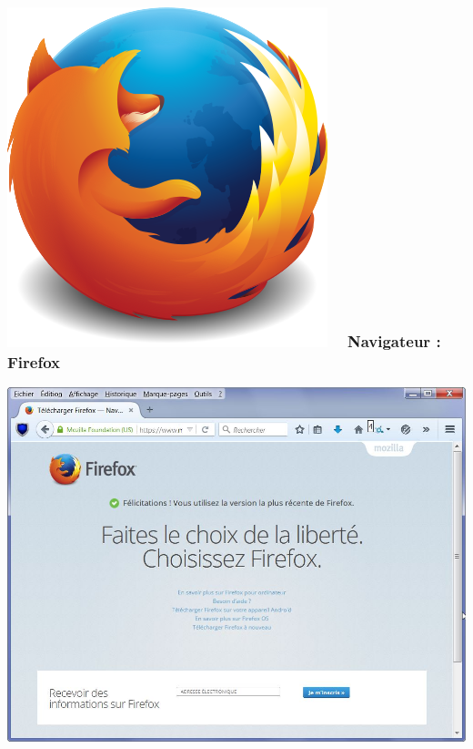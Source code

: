 \documentclass{beamer}
\begin{document}
\begin{frame}
\frametitle{\includegraphics[scale=0.1] {./images/firefox.png} ~  Navigateur : Firefox}
\begin{center}
\includegraphics[scale=0.5] {./images/firefox_capture.jpg} 
\end{center}
\end{frame}
\end{document}
